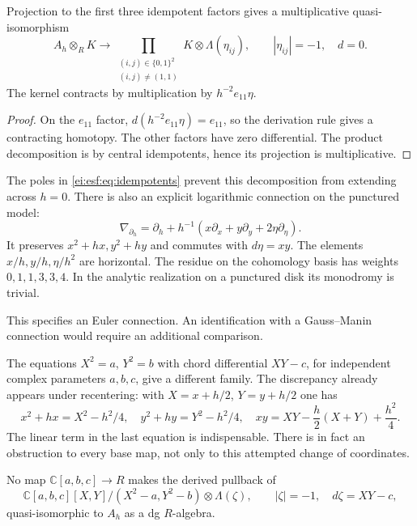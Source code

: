 \begin{proposition}\label{ei:esf:prop:generic}
Projection to the first three idempotent factors gives
a multiplicative quasi-isomorphism
\[
 A_h\otimes_R K\longrightarrow
 \prod_{\substack{(i,j)\in\{0,1\}^2\\(i,j)\ne(1,1)}}
 K\otimes\Lambda(\eta_{ij}),
 \qquad |\eta_{ij}|=-1,\quad d=0.
\]
The kernel contracts by multiplication by
$h^{-2}e_{11}\eta$.
\end{proposition}

\begin{proof}
On the $e_{11}$ factor,
$d(h^{-2}e_{11}\eta)=e_{11}$, so the derivation rule
gives a contracting homotopy. The other factors have
zero differential. The product decomposition is by
central idempotents, hence its projection is multiplicative.
\end{proof}

The poles in \eqref{ei:esf:eq:idempotents} prevent this
decomposition from extending across $h=0$. There is also
an explicit logarithmic connection on the punctured model:
\begin{equation}\label{ei:esf:eq:connection}
 \nabla_{\partial_h}
 =\partial_h+h^{-1}
       (x\partial_x+y\partial_y+2\eta\partial_\eta).
\end{equation}
It preserves $x^2+hx,y^2+hy$ and commutes with $d\eta=xy$.
The elements $x/h,y/h,\eta/h^2$ are horizontal.
The residue on the cohomology basis has weights
$0,1,1,3,3,4$. In the analytic realization on a punctured
disk its monodromy is trivial.

This specifies an Euler
connection. An identification with a Gauss--Manin
connection would require an additional comparison.

The equations $X^2=a$, $Y^2=b$ with chord differential $XY-c$,
for independent complex parameters $a,b,c$, give a different family.
The discrepancy already appears under recentering:
with $X=x+h/2$, $Y=y+h/2$ one has
\[
 x^2+hx=X^2-h^2/4,\quad y^2+hy=Y^2-h^2/4,\quad
 xy=XY-\frac h2(X+Y)+\frac{h^2}{4}.
\]
The linear term in the last equation is indispensable.
There is in fact an obstruction to every base map, not
only to this attempted change of coordinates.

\begin{proposition}\label{ei:esf:prop:no-quadratic-pullback}
No map $\mathbb C[a,b,c]\to R$ makes the derived pullback
of
\[
 \mathbb C[a,b,c][X,Y]/(X^2-a,Y^2-b)
       \otimes\Lambda(\zeta),\qquad |\zeta|=-1,\quad d\zeta=XY-c,
\]
quasi-isomorphic to $A_h$ as a dg $R$-algebra.
\end{proposition}

